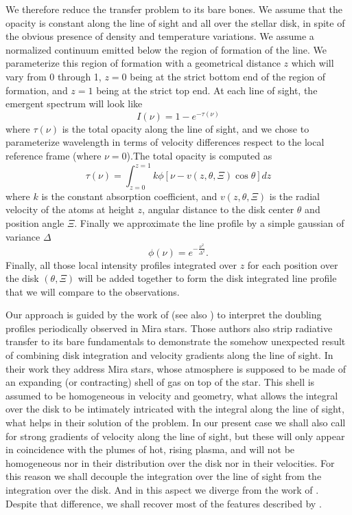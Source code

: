 \documentclass{/Users/art2/TeX/aanda/aa}
\begin{document}
We therefore reduce the transfer problem to its bare bones. We assume that the opacity is constant along the line of sight and all over the stellar 
disk, in spite of the obvious presence of density and temperature variations. We assume a normalized continuum emitted below the region of 
formation of the line. We parameterize this region of formation with a geometrical distance $z$ which will vary from 0 through 1, $z=0$ being at 
the strict bottom end of the region of formation, and $z=1$ being at the strict top end. At each line of sight, the emergent spectrum will look like
\begin{equation}
   I(\nu)=1-e^{-\tau(\nu)}
\end{equation}
where $\tau(\nu)$ is the total opacity along the line of sight, and we chose to parameterize wavelength in terms of velocity differences respect 
to the local reference frame (where $\nu=0$).The total opacity is computed as 
\begin{equation}
   \tau(\nu)=\int_{z=0}^{z=1} k \phi[\nu-v(z,\theta,\Xi)\cos \theta]dz
   \label{opacityintegral}
\end{equation}
where $k$ is the constant absorption coefficient, and $v(z,\theta,\Xi)$ is the radial velocity of the atoms at height $z$, angular distance to the
disk center  $\theta$ and position angle $\Xi$. Finally we approximate the line profile by a simple gaussian of variance $\Delta$ \citep{}
\begin{equation}
   \phi(\nu)= e^{-\frac{\nu^2}{\Delta^2}}.
\end{equation}
Finally, all those local intensity profiles integrated over $z$ for each position over the disk $(\theta,\Xi)$ will be added together to form the 
disk integrated line profile that we will compare to the observations.

Our approach is guided by the work of \cite{Bertout} (see also \cite{Wagenblast, LA}) to interpret the doubling profiles periodically observed in Mira 
stars. Those authors also strip radiative transfer to its bare fundamentals to demonstrate the somehow unexpected result of combining disk integration 
and velocity gradients along the line of sight. In their work they address Mira stars, whose atmosphere is supposed to be made of an expanding (or contracting)
shell of gas on top of the star. This shell is assumed to be homogeneous in velocity and geometry, what allows the integral over the disk to be 
intimately intricated with the integral along the line of sight, what helps in their solution of the problem. In our present case we shall also call 
for strong gradients of velocity along the line of sight, but these will only appear in coincidence with the plumes of hot, rising plasma, and will not be 
homogeneous nor in their distribution over the disk nor in their velocities. For this reason we shall decouple the integration over the line 
of sight from the integration over the disk. And in this aspect we diverge from the work of \cite{Bertout}. Despite that difference, we shall recover most 
of the features described by \cite{Bertout}.
\end{document}
